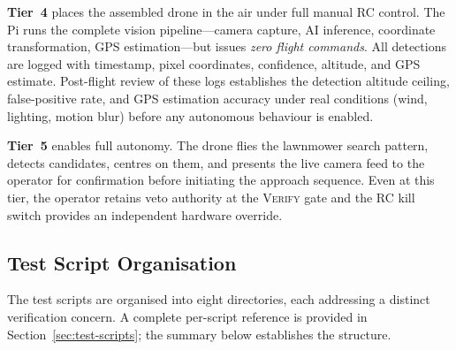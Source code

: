 \textbf{Tier~4} places the assembled drone in the air under full manual RC control. The Pi runs the complete vision pipeline---camera capture, AI inference, coordinate transformation, GPS estimation---but issues \emph{zero flight commands}. All detections are logged with timestamp, pixel coordinates, confidence, altitude, and GPS estimate. Post-flight review of these logs establishes the detection altitude ceiling, false-positive rate, and GPS estimation accuracy under real conditions (wind, lighting, motion blur) before any autonomous behaviour is enabled.

\textbf{Tier~5} enables full autonomy. The drone flies the lawnmower search pattern, detects candidates, centres on them, and presents the live camera feed to the operator for confirmation before initiating the approach sequence. Even at this tier, the operator retains veto authority at the \textsc{Verify} gate and the RC kill switch provides an independent hardware override.

\subsection{Test Script Organisation}\label{sec:test-org}

The test scripts are organised into eight directories, each addressing a distinct verification concern.  A complete per-script reference is provided in Section~\ref{sec:test-scripts}; the summary below establishes the structure.

